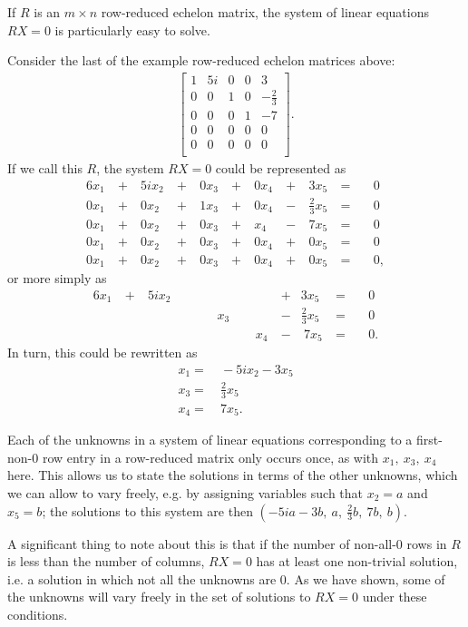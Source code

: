\documentclass[12pt]{article}
\begin{document}
\begin{comm}
  If $R$ is an $m \times n$ row-reduced echelon matrix, the
  system of linear equations $RX = 0$ is particularly easy to
  solve.

  Consider the last of the example row-reduced echelon
  matrices above:
  \begin{align*}
    \begin{bmatrix}
      1 & 5i & 0 & 0 & 3\\
      0 & 0  & 1 & 0 & -\frac{2}{3}\\
      0 & 0  & 0 & 1 & -7\\
      0 & 0  & 0 & 0 & 0\\
      0 & 0  & 0 & 0 & 0\\
    \end{bmatrix}.
  \end{align*}
  If we call this $R$, the system $RX = 0$ could be represented
  as
  \begin{alignat*}{6}
     x_1\ &+&\ 5ix_2\ &+&\ 0x_3\ &+&\ 0x_4\ &+&\           3x_5\ &=&\ &0\\
    0x_1\ &+&\  0x_2\ &+&\ 1x_3\ &+&\ 0x_4\ &-&\ \frac{2}{3}x_5\ &=&\ &0\\
    0x_1\ &+&\  0x_2\ &+&\ 0x_3\ &+&\  x_4\ &-&\           7x_5\ &=&\ &0\\
    0x_1\ &+&\  0x_2\ &+&\ 0x_3\ &+&\ 0x_4\ &+&\           0x_5\ &=&\ &0\\
    0x_1\ &+&\  0x_2\ &+&\ 0x_3\ &+&\ 0x_4\ &+&\           0x_5\ &=&\ &0,
  \end{alignat*}
  or more simply as
  \begin{alignat*}{6}
     x_1\ &+&\ 5ix_2\ & &\      & & & &   &+&            3x_5\ &=&\ &0\\
     & &  & &         & &  x_3\ & &       &-&  \frac{2}{3}x_5\ &=&\ &0\\
     & &  & &         & &       & &\ x_4\ &-&\           7x_5\ &=&\ &0.
  \end{alignat*}
  In turn, this could be rewritten as
  \begin{align*}
    x_1 =&\ -5ix_2 - 3x_5\\
    x_3 =&\ \frac{2}{3}x_5\\
    x_4 =&\ 7x_5.
  \end{align*}

  Each of the unknowns in a system of linear equations
  corresponding to a first-non-0 row entry in a row-reduced
  matrix only occurs once, as with $x_1,\ x_3,\ x_4$ here. This
  allows us to state the solutions in terms of the other
  unknowns, which we can allow to vary freely, e.g. by assigning
  variables such that $x_2 = a$ and $x_5 = b$; the solutions to
  this system are then $(-5ia -3b,\ a,\ \frac{2}{3}b,\ 7b,\ b)$.

  A significant thing to note about this is that if the number of
  non-all-0 rows in $R$ is less than the number of columns, $RX =
  0$ has at least one non-trivial solution, i.e. a solution in
  which not all the unknowns are $0$. As we have shown, some of
  the unknowns will vary freely in the set of solutions to $RX =
  0$ under these conditions.
\end{comm}
\end{document}

